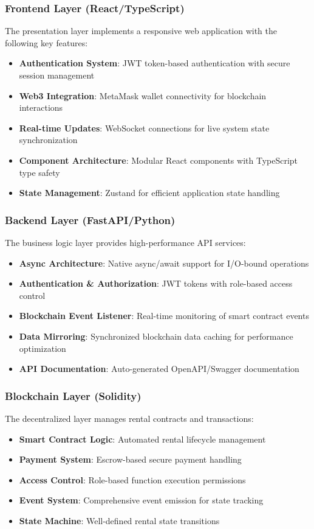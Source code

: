 \documentclass[12pt,a4paper]{article}
\begin{document}
\subsubsection{Frontend Layer (React/TypeScript)}
The presentation layer implements a responsive web application with the following key features:
\begin{itemize}
    \item \textbf{Authentication System}: JWT token-based authentication with secure session management
    \item \textbf{Web3 Integration}: MetaMask wallet connectivity for blockchain interactions
    \item \textbf{Real-time Updates}: WebSocket connections for live system state synchronization
    \item \textbf{Component Architecture}: Modular React components with TypeScript type safety
    \item \textbf{State Management}: Zustand for efficient application state handling
\end{itemize}

\subsubsection{Backend Layer (FastAPI/Python)}
The business logic layer provides high-performance API services:
\begin{itemize}
    \item \textbf{Async Architecture}: Native async/await support for I/O-bound operations
    \item \textbf{Authentication \& Authorization}: JWT tokens with role-based access control
    \item \textbf{Blockchain Event Listener}: Real-time monitoring of smart contract events
    \item \textbf{Data Mirroring}: Synchronized blockchain data caching for performance optimization
    \item \textbf{API Documentation}: Auto-generated OpenAPI/Swagger documentation
\end{itemize}

\subsubsection{Blockchain Layer (Solidity)}
The decentralized layer manages rental contracts and transactions:
\begin{itemize}
    \item \textbf{Smart Contract Logic}: Automated rental lifecycle management
    \item \textbf{Payment System}: Escrow-based secure payment handling
    \item \textbf{Access Control}: Role-based function execution permissions
    \item \textbf{Event System}: Comprehensive event emission for state tracking
    \item \textbf{State Machine}: Well-defined rental state transitions
\end{itemize}
\end{document}
